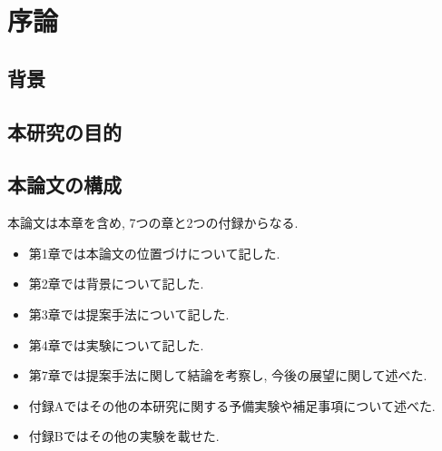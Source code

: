 \chapter{序論}

\section{背景}

\section{本研究の目的}

\section{本論文の構成}
本論文は本章を含め, 7つの章と2つの付録からなる.
\begin{itemize}
	\item 第1章では本論文の位置づけについて記した.
	\item 第2章では背景について記した.
	\item 第3章では提案手法について記した.
	\item 第4章では実験について記した.
	\item 第7章では提案手法に関して結論を考察し, 今後の展望に関して述べた.
	\item 付録Aではその他の本研究に関する予備実験や補足事項について述べた.
	\item 付録Bではその他の実験を載せた.
\end{itemize}